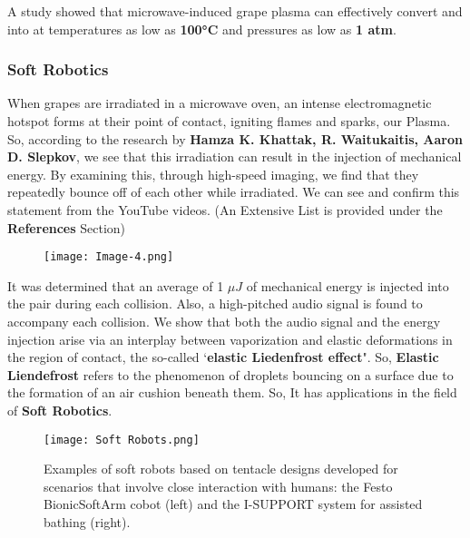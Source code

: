 \documentclass{article}
\begin{document}
A study showed that microwave-induced grape plasma can effectively convert  and  into  at temperatures as low as \textbf {100°C} and pressures as low as \textbf {1 atm}.\cite{7}


\subsubsection{\Large Soft Robotics}
\large
When grapes are irradiated in a microwave oven, an intense electromagnetic hotspot forms at their point of contact, igniting flames and sparks, our Plasma. So, according to the research by \textbf{Hamza K. Khattak, R. Waitukaitis, Aaron D. Slepkov},\cite{4} we see that this irradiation can result in the injection of mechanical energy. By examining this, through high-speed imaging, we find that they repeatedly bounce off of each other while irradiated. We can see and confirm this statement from the YouTube videos. (An Extensive List is provided under the \textbf{References} Section)


\begin{figure}[h]
        \centering
        \texttt{[image: Image-4.png]}
        \caption{\cite{4}}
        
     \label{fig:}
    \end{figure}

It was determined that an average of 1 $\mu J $ of mechanical energy is injected into the pair during each collision. Also, a high-pitched audio signal is found to accompany each collision. We show that both the audio signal and the energy injection arise via an interplay between vaporization and elastic deformations in the region of contact, the so-called ‘\textbf {elastic Liedenfrost effect}".
So, \textbf {Elastic Liendefrost} refers to the phenomenon of droplets bouncing on a surface due to the formation of an air cushion beneath them.
So, It has applications in the field of \textbf{Soft Robotics}.
\begin{figure}[h]
        \centering
        \texttt{[image: Soft Robots.png]}
        \caption{\label{fig: Soft Robots}
        \footnotesize Examples of soft robots based on tentacle designs developed for scenarios that involve close interaction with humans: the Festo BionicSoftArm cobot (left) and the I-SUPPORT system for assisted bathing (right).\cite{2}}
    \end{figure}
\end{document}
